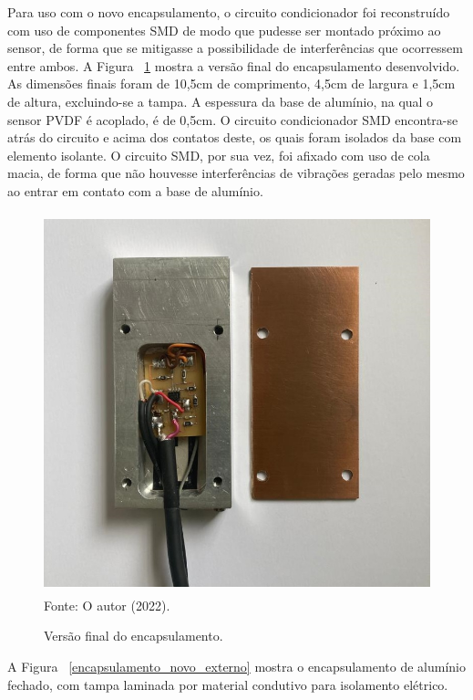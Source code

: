 \documentclass[
	12pt,				
	oneside,			
	a4paper,			
	english,			
	brazil,	
	sumario=abnt-6027-2012		
	]{abntex2ppgsi}
\begin{document}
Para uso com o novo encapsulamento, o circuito condicionador foi reconstruído com uso de componentes SMD de modo que pudesse ser montado próximo ao sensor, de forma que se mitigasse a possibilidade de interferências que ocorressem entre ambos. A Figura ~\ref{encapsulamento_novo_interno} mostra a versão final do encapsulamento desenvolvido. As dimensões finais foram de 10,5cm de comprimento, 4,5cm de largura e 1,5cm de altura, excluindo-se a tampa. A espessura da base de alumínio, na qual o sensor PVDF é acoplado, é de 0,5cm. O circuito condicionador SMD encontra-se atrás do circuito e acima dos contatos deste, os quais foram isolados da base com elemento isolante. O circuito SMD, por sua vez, foi afixado com uso de cola macia, de forma que não houvesse interferências de vibrações geradas pelo mesmo ao entrar em contato com a base de alumínio.

\begin{figure}[H]
\centering
\caption {Versão final do encapsulamento. }
\includegraphics[width=\textwidth,height=110mm,keepaspectratio]{encapsulamento_novo_interno} \\
Fonte: O autor (2022).
\label{encapsulamento_novo_interno}
\end{figure} 

A Figura ~\ref{encapsulamento_novo_externo} mostra o encapsulamento de alumínio fechado, com tampa laminada por material condutivo para isolamento elétrico. 
\end{document}
